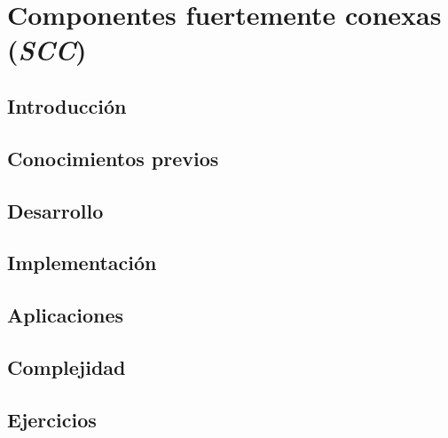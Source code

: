 \chapter{Componentes fuertemente conexas (\emph{SCC})}
\section{Introducción}

\section{Conocimientos previos}

\section{Desarrollo}

\section{Implementación}

\section{Aplicaciones}

\section{Complejidad}

\section{Ejercicios}
